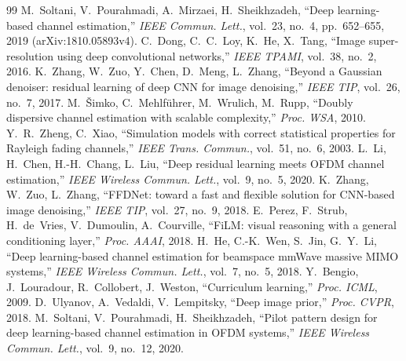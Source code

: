 \documentclass[10pt,a4paper]{article}
\begin{document}
{\small
\begin{thebibliography}{99}\setlength{\itemsep}{0pt}
 M.~Soltani, V.~Pourahmadi, A.~Mirzaei, H.~Sheikhzadeh, ``Deep learning-based channel
  estimation,'' \emph{IEEE Commun. Lett.}, vol.~23, no.~4, pp.~652--655, 2019 (arXiv:1810.05893v4).
 C.~Dong, C.~C.~Loy, K.~He, X.~Tang, ``Image super-resolution using deep convolutional
  networks,'' \emph{IEEE TPAMI}, vol.~38, no.~2, 2016.
 K.~Zhang, W.~Zuo, Y.~Chen, D.~Meng, L.~Zhang, ``Beyond a Gaussian denoiser: residual
  learning of deep CNN for image denoising,'' \emph{IEEE TIP}, vol.~26, no.~7, 2017.
 M.~\v{S}imko, C.~Mehlf\"uhrer, M.~Wrulich, M.~Rupp, ``Doubly dispersive channel
  estimation with scalable complexity,'' \emph{Proc. WSA}, 2010.
 Y.~R.~Zheng, C.~Xiao, ``Simulation models with correct statistical properties for
  Rayleigh fading channels,'' \emph{IEEE Trans. Commun.}, vol.~51, no.~6, 2003.
 L.~Li, H.~Chen, H.-H.~Chang, L.~Liu, ``Deep residual learning meets OFDM channel
  estimation,'' \emph{IEEE Wireless Commun. Lett.}, vol.~9, no.~5, 2020.
 K.~Zhang, W.~Zuo, L.~Zhang, ``FFDNet: toward a fast and flexible solution for CNN-based
  image denoising,'' \emph{IEEE TIP}, vol.~27, no.~9, 2018.
 E.~Perez, F.~Strub, H.~de~Vries, V.~Dumoulin, A.~Courville, ``FiLM: visual reasoning with a
  general conditioning layer,'' \emph{Proc. AAAI}, 2018.
 H.~He, C.-K.~Wen, S.~Jin, G.~Y.~Li, ``Deep learning-based channel estimation for
  beamspace mmWave massive MIMO systems,'' \emph{IEEE Wireless Commun. Lett.}, vol.~7, no.~5, 2018.
 Y.~Bengio, J.~Louradour, R.~Collobert, J.~Weston, ``Curriculum learning,''
  \emph{Proc. ICML}, 2009.
 D.~Ulyanov, A.~Vedaldi, V.~Lempitsky, ``Deep image prior,'' \emph{Proc. CVPR}, 2018.
 M.~Soltani, V.~Pourahmadi, H.~Sheikhzadeh, ``Pilot pattern design for deep
  learning-based channel estimation in OFDM systems,'' \emph{IEEE Wireless Commun. Lett.}, vol.~9,
  no.~12, 2020.
\end{thebibliography}
}
\end{document}
